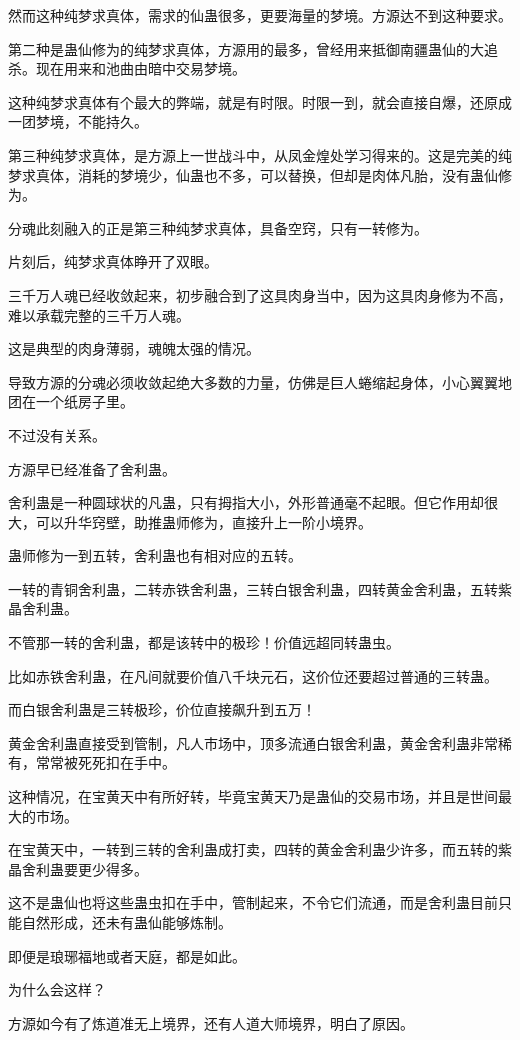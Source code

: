 \begin{this_body}
然而这种纯梦求真体，需求的仙蛊很多，更要海量的梦境。方源达不到这种要求。

第二种是蛊仙修为的纯梦求真体，方源用的最多，曾经用来抵御南疆蛊仙的大追杀。现在用来和池曲由暗中交易梦境。

这种纯梦求真体有个最大的弊端，就是有时限。时限一到，就会直接自爆，还原成一团梦境，不能持久。

第三种纯梦求真体，是方源上一世战斗中，从凤金煌处学习得来的。这是完美的纯梦求真体，消耗的梦境少，仙蛊也不多，可以替换，但却是肉体凡胎，没有蛊仙修为。

分魂此刻融入的正是第三种纯梦求真体，具备空窍，只有一转修为。

片刻后，纯梦求真体睁开了双眼。

三千万人魂已经收敛起来，初步融合到了这具肉身当中，因为这具肉身修为不高，难以承载完整的三千万人魂。

这是典型的肉身薄弱，魂魄太强的情况。

导致方源的分魂必须收敛起绝大多数的力量，仿佛是巨人蜷缩起身体，小心翼翼地团在一个纸房子里。

不过没有关系。

方源早已经准备了舍利蛊。

舍利蛊是一种圆球状的凡蛊，只有拇指大小，外形普通毫不起眼。但它作用却很大，可以升华窍壁，助推蛊师修为，直接升上一阶小境界。

蛊师修为一到五转，舍利蛊也有相对应的五转。

一转的青铜舍利蛊，二转赤铁舍利蛊，三转白银舍利蛊，四转黄金舍利蛊，五转紫晶舍利蛊。

不管那一转的舍利蛊，都是该转中的极珍！价值远超同转蛊虫。

比如赤铁舍利蛊，在凡间就要价值八千块元石，这价位还要超过普通的三转蛊。

而白银舍利蛊是三转极珍，价位直接飙升到五万！

黄金舍利蛊直接受到管制，凡人市场中，顶多流通白银舍利蛊，黄金舍利蛊非常稀有，常常被死死扣在手中。

这种情况，在宝黄天中有所好转，毕竟宝黄天乃是蛊仙的交易市场，并且是世间最大的市场。

在宝黄天中，一转到三转的舍利蛊成打卖，四转的黄金舍利蛊少许多，而五转的紫晶舍利蛊要更少得多。

这不是蛊仙也将这些蛊虫扣在手中，管制起来，不令它们流通，而是舍利蛊目前只能自然形成，还未有蛊仙能够炼制。

即便是琅琊福地或者天庭，都是如此。

为什么会这样？

方源如今有了炼道准无上境界，还有人道大师境界，明白了原因。


\end{this_body}
